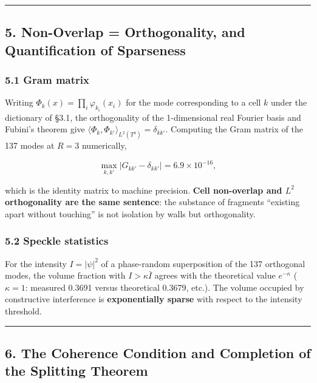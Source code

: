 \documentclass[
]{article}
\begin{document}
\begin{center}\rule{0.5\linewidth}{0.5pt}\end{center}

\subsection{5. Non-Overlap = Orthogonality, and Quantification of
Sparseness}\label{non-overlap-orthogonality-and-quantification-of-sparseness}

\subsubsection{5.1 Gram matrix}\label{gram-matrix}

Writing \(\Phi_k(x)=\prod_i\varphi_{k_i}(x_i)\) for the mode
corresponding to a cell \(k\) under the dictionary of §3.1, the
orthogonality of the 1-dimensional real Fourier basis and Fubini's
theorem give \(\langle\Phi_k,\Phi_{k'}\rangle_{L^2(T^4)}=\delta_{kk'}\).
Computing the Gram matrix of the 137 modes at \(R=3\) numerically,

\[
\max_{k,k'}\bigl|G_{kk'}-\delta_{kk'}\bigr| = 6.9\times10^{-16},
\]

which is the identity matrix to machine precision. \textbf{Cell
non-overlap and \(L^2\) orthogonality are the same sentence}: the
substance of fragments ``existing apart without touching'' is not
isolation by walls but orthogonality.

\subsubsection{5.2 Speckle statistics}\label{speckle-statistics}

For the intensity \(I=|\psi|^2\) of a phase-random superposition of the
137 orthogonal modes, the volume fraction with \(I>\kappa\bar I\) agrees
with the theoretical value \(e^{-\kappa}\) (\(\kappa=1\): measured
0.3691 versus theoretical 0.3679, etc.). The volume occupied by
constructive interference is \textbf{exponentially sparse} with respect
to the intensity threshold.

\begin{center}\rule{0.5\linewidth}{0.5pt}\end{center}

\subsection{6. The Coherence Condition and Completion of the Splitting
Theorem}\label{the-coherence-condition-and-completion-of-the-splitting-theorem}
\end{document}
